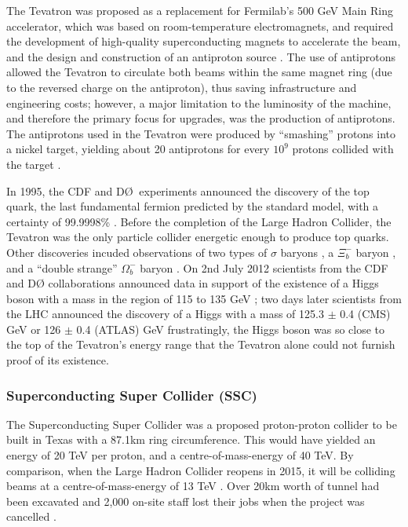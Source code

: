 The Tevatron was proposed as a replacement for Fermilab's 500 GeV Main Ring accelerator, which was based on room-temperature electromagnets, and required the development of high-quality superconducting magnets to accelerate the beam, and the design and construction of an antiproton source \cite{Tevatron:Retrospective:Online}. The use of antiprotons allowed the Tevatron to circulate both beams within the same magnet ring (due to the reversed charge on the antiproton), thus saving infrastructure and engineering costs; however, a major limitation to the luminosity of the machine, and therefore the primary focus for upgrades, was the production of antiprotons. The antiprotons used in the Tevatron were produced by ``smashing'' protons into a nickel target, yielding about 20 antiprotons for every $10^{9}$ protons collided with the target \cite{Tevatron:Antiprotons:Online}.

In 1995, the CDF and D\O$\:$ experiments announced the discovery of the top quark, the last fundamental fermion predicted by the standard model, with a certainty of 99.9998\% \cite{PhysRevLett:Top1,PhysRevLett:Top2}. Before the completion of the Large Hadron Collider, the Tevatron was the only particle collider energetic enough to produce top quarks. Other discoveries incuded observations of two types of $\sigma$ baryons \cite{Fermi:Sigma:Online}, a $\Xi_{b}^{-}$ baryon \cite{Fermi:Xi:Online}, and a ``double strange'' $\Omega_{b}^{-}$ baryon \cite{PhysRevLett:Omega}. On 2nd July 2012 scientists from the CDF and D\O\: collaborations announced data in support of the existence of a Higgs boson with a mass in the region of 115 to 135 GeV \cite{Fermi:Higgs:Online}; two days later scientists from the LHC announced the discovery of a Higgs with a mass of 125.3 $\pm$ 0.4 (CMS) GeV \cite{PhysLettB:Higgs:CMS} or 126 $\pm$ 0.4 (ATLAS) GeV \cite{PhysLettB:Higgs:ATLAS}\textemdash frustratingly, the Higgs boson was so close to the top of the Tevatron's energy range that the Tevatron alone could not furnish proof of its existence.

\subsubsection{Superconducting Super Collider (SSC)}
The Superconducting Super Collider was a proposed proton-proton \cite{SSC:LAT:Online} collider to be built in Texas with a 87.1km ring circumference. This would have yielded an energy of 20 TeV per proton, and a centre-of-mass-energy of 40 TeV. By comparison, when the Large Hadron Collider reopens in 2015, it will be colliding beams at a centre-of-mass-energy of 13 TeV \cite{LHC:14TeV:Online}. Over 20km worth of tunnel had been excavated and 2,000 on-site staff lost their jobs when the project was cancelled \cite{SSC:Sun:Online}.

